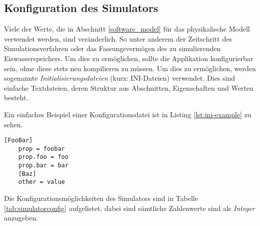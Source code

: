 \subsection{Konfiguration des Simulators}

Viele der Werte, die in Abschnitt \ref{software_model} für das physikalische Modell verwendet werden, sind veränderlich. So unter anderem der Zeitschritt des Simulationsverfahren oder das Fassungsvermögen des zu simulierenden Eiswasserspeichers. Um dies zu ermöglichen, sollte die Applikation konfigurierbar sein, ohne diese stets neu kompilieren zu müssen. Um dies zu ermöglichen, werden sogenannte \emph{Initialisierungsdateien} (kurz: INI-Dateien) verwendet. Dies sind einfache Textdateien, deren Struktur aus Abschnitten, Eigenschaften und Werten besteht. %

Ein einfaches Beispiel einer Konfigurationsdatei ist in Listing \ref{lst:ini-example} zu sehen.

\lstset{basicstyle=\footnotesize\ttfamily}
\begin{lstlisting}[frame=single, caption=INI-Datei Beispiel, label=lst:ini-example]
	[FooBar]
	prop = foobar
	prop.foo = foo
	prop.bar = bar
	[Baz]
	other = value
\end{lstlisting}

Die Konfigurationsmöglichkeiten des Simulators sind in Tabelle \ref{tab:simulatorconfig} aufgelistet, dabei sind sämtliche Zahlenwerte sind als \emph{Integer} anzugeben.

